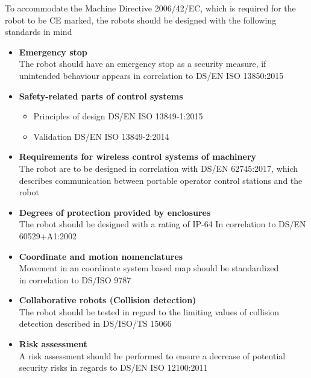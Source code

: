 \vspace{2mm}

To accommodate the Machine Directive 2006/42/EC, which is required for the robot to be CE marked, the robots should be designed with the following standards in mind

\begin{itemize}
\setlength{\itemsep}{0.05\baselineskip}
\item \textbf{Emergency stop}\\
The robot should have an emergency stop as a security measure, if unintended behaviour appears in correlation to DS/EN ISO 13850:2015

\item \textbf{Safety-related parts of control systems}
\begin{itemize}
\setlength{\itemsep}{0.05\baselineskip}
\item Principles of design DS/EN ISO 13849-1:2015
\item Validation DS/EN ISO 13849-2:2014
\end{itemize}

\item \textbf{Requirements for wireless control systems of machinery}\\
The robot are to be designed in correlation with DS/EN 62745:2017, which describes communication between portable operator control stations and the robot

\item \textbf{Degrees of protection provided by enclosures}\\
The robot should be designed with a rating of IP-64
In correlation to DS/EN 60529+A1:2002

\item \textbf{Coordinate and motion nomenclatures}\\
Movement in an coordinate system based map should be standardized\\
in correlation to DS/ISO 9787

\item \textbf{Collaborative robots (Collision detection)}\\
The robot should be tested in regard to the limiting values of collision detection described in DS/ISO/TS 15066

\item \textbf{Risk assessment}\\
A risk assessment should be performed to ensure a decrease of potential security risks in regards to DS/EN ISO 12100:2011
\end{itemize}

